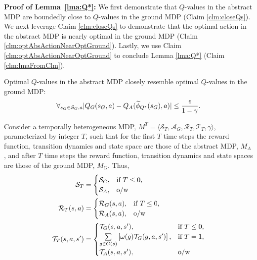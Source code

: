 \textbf{Proof of Lemma~\ref{lma:Q*}:}
We first demonstrate that $Q$-values in the abstract \ac{MDP} are boundedly close to $Q$-values in the ground \ac{MDP} (Claim \ref{clm:closeQs}). We next leverage Claim \ref{clm:closeQs} to demonstrate that the optimal action in the abstract \ac{MDP} is nearly optimal in the ground \ac{MDP}  (Claim \ref{clm:optAbsActionNearOptGround}). Lastly, we use Claim \ref{clm:optAbsActionNearOptGround} to conclude Lemma \ref{lma:Q*} (Claim \ref{clm:lmaFromClm}).
\begin{clm}
\label{clm:closeQs}
Optimal $Q$-values in the abstract \ac{MDP} closely resemble optimal $Q$-values in the ground \ac{MDP}:
\begin{equation}
\label{eq:Q*Claim1}
\forall_{s_G \in \mathcal{S}_G, a} |Q_G(s_G, a) - Q_A(\widetilde \phi_{Q^*}(s_G), a)| \leq \frac{\epsilon}{1-\gamma}.
\end{equation}
\end{clm}

Consider a temporally heterogeneous \ac{MDP}, $M^T = \langle \mathcal{S}_T, \mathcal{A}_G, \mathcal{R}_T, \mathcal{T}_T, \gamma \rangle$, parameterized by integer $T$, such that for the first $T$ time steps the reward function, transition dynamics and state space are those of the abstract MDP, $M_A$, and after $T$ time steps the reward function, transition dynamics and state spaces are those of the ground MDP, $M_G$. Thus,
\begin{align*}
\mathcal{S}_T &= \begin{cases}
\mathcal{S}_G,& \text{if } T \leq 0, \\
\mathcal{S}_A,& \text{o/w}
\end{cases}\\
\mathcal{R}_T(s,a) &= \begin{cases}
\mathcal{R}_G(s,a),& \text{if } T \leq 0, \\
\mathcal{R}_A(s, a),& \text{o/w}
\end{cases}\\
\mathcal{T}_T(s,a,s') &= \begin{cases}
\mathcal{T}_G(s,a,s'),& \text{if }T \leq 0, \\
\underset{{g \in G(s)}}{\sum}\left[\omega(g)\mathcal{T}_G(g, a, s')\right],& \text{if } T = 1, \\
\mathcal{T}_A(s,a,s'),& \text{o/w}
\end{cases}\\
\end{align*}


